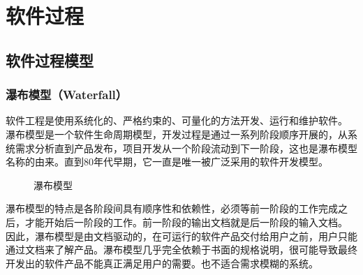 \chapter{软件过程}

\section{软件过程模型}

\subsection{瀑布模型（Waterfall）}

软件工程是使用系统化的、严格约束的、可量化的方法开发、运行和维护软件。\\

瀑布模型是一个软件生命周期模型，开发过程是通过一系列阶段顺序开展的，从系统需求分析直到产品发布，项目开发从一个阶段流动到下一阶段，这也是瀑布模型名称的由来。直到80年代早期，它一直是唯一被广泛采用的软件开发模型。\\

\begin{figure}[H]
    \centering
    \caption{瀑布模型}
\end{figure}

瀑布模型的特点是各阶段间具有顺序性和依赖性，必须等前一阶段的工作完成之后，才能开始后一阶段的工作。前一阶段的输出文档就是后一阶段的输入文档。\\

因此，瀑布模型是由文档驱动的，在可运行的软件产品交付给用户之前，用户只能通过文档来了解产品。瀑布模型几乎完全依赖于书面的规格说明，很可能导致最终开发出的软件产品不能真正满足用户的需要。也不适合需求模糊的系统。\\

